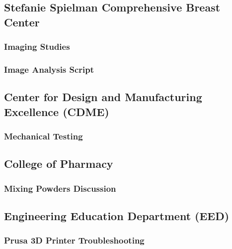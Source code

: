 \subsection{Stefanie Spielman Comprehensive Breast Center\label{sec:methedology:externalLabs:imagingStudy}}

\subsubsection{Imaging Studies\label{sec:methedology:externalLabs:imagingStudy:imagingStudies}}

\subsubsection{Image Analysis Script\label{sec:methedology:externalLabs:imagingStudy:imageAnalysisScript}}

\subsection{Center for Design and Manufacturing Excellence (CDME)\label{sec:methedology:externalLabs:cdme}}

\subsubsection{Mechanical Testing\label{sec:methedology:externalLabs:cdme:mechanicalTesting}}

\subsection{College of Pharmacy\label{sec:methedology:externalLabs:pharmacy}}

\subsubsection{Mixing Powders Discussion\label{sec:methedology:externalLabs:pharmacy:mixingPowdersDiscussion}}

\subsection{Engineering Education Department (EED)\label{sec:methedology:externalLabs:eed}}

\subsubsection{Prusa 3D Printer Troubleshooting\label{sec:methedology:externalLabs:eed:prusaTroubleshooting}}

